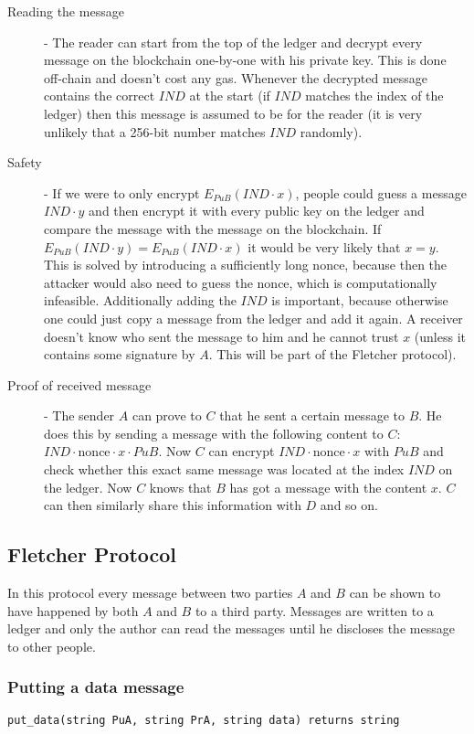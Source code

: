 \documentclass[a4paper]{article} %
\begin{document}
\begin{description}
\item[Reading the message] - The reader can start from the top of the ledger and decrypt every message on the blockchain one-by-one with his private key. This is done off-chain and doesn't cost any gas. Whenever the decrypted message contains the correct $IND$ at the start (if $IND$ matches the index of the ledger) then this message is assumed to be for the reader (it is very unlikely that a 256-bit number matches $IND$ randomly).

\item[Safety] - If we were to only encrypt $E_{PuB}(IND \cdot x)$, people could guess a message $IND \cdot y$ and then encrypt it with every public key on the ledger and compare the message with the message on the blockchain. If $E_{PuB}(IND \cdot y) = E_{PuB}(IND \cdot x)$ it would be very likely that $x=y$. This is solved by introducing a sufficiently long nonce, because then the attacker would also need to guess the nonce, which is computationally infeasible.
Additionally adding the $IND$ is important, because otherwise one could just copy a message from the ledger and add it again.
A receiver doesn't know who sent the message to him and he cannot trust $x$ (unless it contains some signature by $A$. This will be part of the Fletcher protocol).

\item[Proof of received message] - The sender $A$ can prove to $C$ that he sent a certain message to $B$. He does this by sending a message with the following content to $C$:
$IND \cdot \text{nonce} \cdot x \cdot PuB$. Now $C$ can encrypt $IND \cdot \text{nonce} \cdot x$ with $PuB$ and check whether this exact same message was located at the index $IND$ on the ledger. Now $C$ knows that $B$ has got a message with the content $x$.
$C$ can then similarly share this information with $D$ and so on.
\end{description}
\newpage

\subsection{Fletcher Protocol}
In this protocol every message between two parties $A$ and $B$ can be shown to have happened by both $A$ and $B$ to a third party. Messages are written to a ledger and only the author can read the messages until he discloses the message to other people.


\subsubsection{Putting a data message}
\lstinline{put_data(string PuA, string PrA, string data) returns string}
\end{document}
